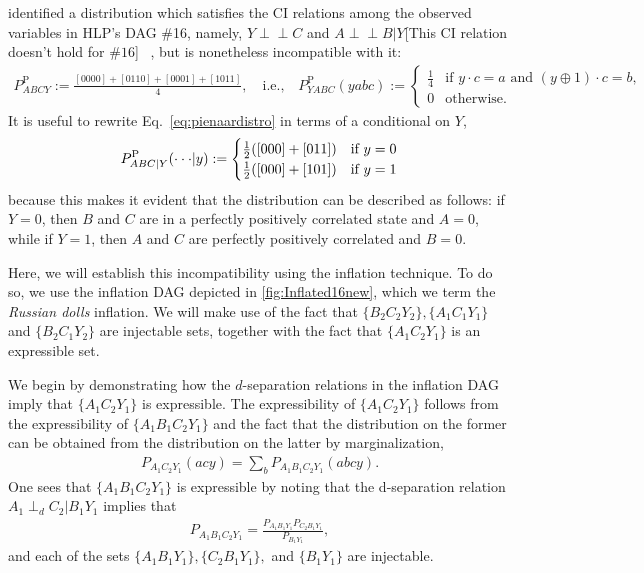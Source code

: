 \documentclass[aps,english,10pt,superscriptaddress,onecolumn,twoside,longbibliography,pra,floatfix,fleqn,nofootinbib]{revtex4-1}%
\theoremstyle{definition}
\newcommand{\indep}{\perp\!\!\!\!\perp} %
\newcommand{\eql}{=}
\DeclarePairedDelimiter{\parenths}{\lparen}{\rparen}
\begin{document}
\citet{pianaar2016interesting} identified a distribution which satisfies the CI relations among the observed variables in HLP's DAG \#16, namely, $Y\indep C$ and $A\indep B | Y$\color{red}[This CI relation doesn't hold for $\#16$] \color{blue}~\cite{pusey2014gdag}, but is nonetheless incompatible with it:
\begin{align}\label{eq:pienaardistro}
    P^{\text{P}}_{A B C Y}:=\frac{[0000]+[0110]+[0001]+[1011]}{4},\quad\text{i.e.,}\quad P^{\text{P}}_{Y\! A B C}(y a b c):=\begin{cases}\tfrac{1}{4}&\text{if }  y\cdot c = a \text{ and }  (y \oplus 1)\cdot c = b, \\ 0&\text{otherwise}.\end{cases}
\end{align}
It is useful to rewrite Eq.~\eqref{eq:pienaardistro} in terms of a conditional on $Y$,
\begin{align}\label{eq:pienaardistroconditiona}
  P^{\text{P}}_{A B C|Y}(\cdot \cdot \cdot | y):=\begin{cases}\frac{1}{2}\parenths{[000]+[011]}&\text{if }  y\eql 0 \\ \frac{1}{2}\parenths{[000]+[101]}&\text{if }  y\eql 1\end{cases}
\end{align}
because this makes it evident that the distribution can be described as follows: if $Y=0$, then $B$ and $C$ are in a perfectly positively correlated state and $A=0$, while if $Y=1$, then $A$ and $C$ are perfectly positively correlated and $B=0$.

Here, we will establish this incompatibility using the inflation technique.  To do so, we use the inflation DAG
depicted in \cref{fig:Inflated16new}, which we term the {\em Russian dolls} inflation.  
We will make use of the fact that $\{ B_2 C_2 Y_2\}, \{ A_1 C_1 Y_1\}$ and $\{B_2 C_1 Y_2 \}$ are injectable sets, together with the fact that $\{ A_1 C_2 Y_1\}$ is an expressible set. 

We begin by demonstrating how the $d$-separation relations in the inflation DAG imply that $\{ A_1 C_2 Y_1\}$ is expressible.  The expressibility of $\{ A_1 C_2 Y_1\}$ follows from the expressibility of $\{ A_1 B_1 C_2 Y_1\}$ and the fact that the distribution on the former can be obtained from the distribution on the latter by marginalization,
\begin{align}\label{express0}
P_{A_1 C_2 Y_1}(acy) = \sum_{b} P_{ A_1 B_1 C_2 Y_1}(abcy).
\end{align}
One sees that  $\{ A_1 B_1 C_2 Y_1\}$ is expressible by noting that the d-separation relation $A_1 \perp_d C_2 | B_1 Y_1$ implies that
\begin{align}\label{express1}
P_{A_1 B_1 C_2 Y_1} = \frac{P_{A_1 B_1 Y_1} P_{C_2 B_1 Y_1} }{P_{B_1 Y_1}},
\end{align}
and each of the sets $\{A_1 B_1 Y_1\}, \{C_2 B_1 Y_1\},$ and $\{B_1 Y_1\}$ are injectable.  
\end{document}
